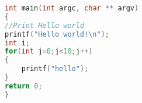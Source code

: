 \documentclass[a4paper]{article}
\begin{document}
\begin{lstlisting}[language={C}]
int main(int argc, char ** argv)
{
//Print Hello world
printf("Hello world!\n");
int i;
for(int j=0;j<10;j++)
{
	printf("hello");
}
return 0;
}
\end{lstlisting}
\end{document}
